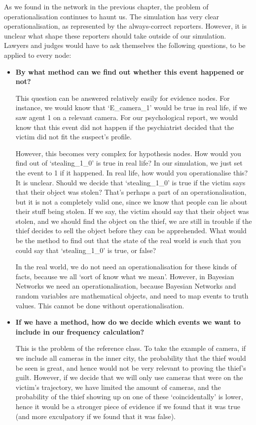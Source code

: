 As we found in the network in the previous chapter, the problem of operationalisation continues to haunt us. The simulation has very clear operationalisation, as represented by the always-correct reporters. However, it is unclear what shape these reporters should take outside of our simulation. Lawyers and judges would have to ask themselves the following questions, to be applied to every node:

\begin{itemize}
\item \textbf{By what method can we find out whether this event happened or not?}

This question can be answered relatively easily for evidence nodes. For instance, we would know that `E\_camera\_1' would be true in real life, if we saw agent 1 on a relevant camera. For our psychological report, we would know that this event did not happen if the psychiatrist decided that the victim did not fit the suspect's profile.

However, this becomes very complex for hypothesis nodes. How would you find out of `stealing\_1\_0' is true in real life? In our simulation, we just set the event to 1 if it happened. In real life, how would you operationalise this? It is unclear. Should we decide that `stealing\_1\_0' is true if the victim says that their object was stolen? That's perhaps a part of an operationalisation, but it is not a completely valid one, since we know that people can lie about their stuff being stolen. If we say, the victim should say that their object was stolen, and we should find the object on the thief, we are still in trouble if the thief decides to sell the object before they can be apprehended. What would be the method to find out that the state of the real world is such that you could say that `stealing\_1\_0' is true, or false?

 In the real world, we do not need an operationalisation for these kinds of facts, because we all `sort of know what we mean'. However, in Bayesian Networks we need an operationalisation, because Bayesian Networks and random variables are mathematical objects, and need to map events to truth values. This cannot be done without operationalisation.

\item \textbf{If we have a method, how do we decide which events we want to include in our frequency calculation?}

This is the problem of the reference class. To take the example of camera, if we include all cameras in the inner city, the probability that the thief would be seen is great, and hence would not be very relevant to proving the thief's guilt. However, if we decide that we will only use cameras that were on the victim's trajectory, we have limited the amount of cameras, and the probability of the thief showing up on one of these `coincidentally' is lower, hence it would be a stronger piece of evidence if we found that it was true (and more exculpatory if we found that it was false). 


\end{itemize}
